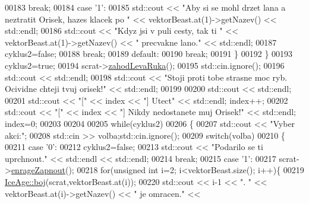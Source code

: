 \begin{DoxyCode}
00183                     \textcolor{keywordflow}{break};
00184                 \textcolor{keywordflow}{case} \textcolor{charliteral}{'1'}:
00185                     std::cout << \textcolor{stringliteral}{"Aby si se mohl drzet lana a neztratit Orisek, hazes klacek po "} << 
      vektorBeast.at(1)->getNazev() << std::endl;
00186                     std::cout << \textcolor{stringliteral}{"Kdyz jsi v puli cesty, tak ti "} << vektorBeast.at(1)->getNazev() << \textcolor{stringliteral}{"
       precvakne lano."} << std::endl;
00187                     cyklus2=\textcolor{keyword}{false};
00188                     \textcolor{keywordflow}{break};
00189                 \textcolor{keywordflow}{default}:
00190                     \textcolor{keywordflow}{break};
00191             \}
00192     \}
00193     cyklus2=\textcolor{keyword}{true};
00194     scrat->\hyperlink{classIceAge_1_1ObleceneVybaveniVeverky_ab02450c60394e0c21e08beff15971c60}{zahodLevaRuka}(); 
00195     std::cin.ignore();
00196     std::cout << std::endl;
00198     std::cout << \textcolor{stringliteral}{"Stoji proti tobe strasne moc ryb. Ocividne chteji tvuj orisek!"} << std::endl;
00199 
00200     std::cout << std::endl;
00201     std::cout << \textcolor{stringliteral}{"["} << index << \textcolor{stringliteral}{"] Utect"} << std::endl; index++;
00202     std::cout << \textcolor{stringliteral}{"["} << index << \textcolor{stringliteral}{"] Nikdy nedostanete muj Orisek!"} << std::endl; index=0;
00203 
00204 
00205     \textcolor{keywordflow}{while}(cyklus2)
00206     \{
00207         std::cout << \textcolor{stringliteral}{"Vyber akci:"};
00208         std::cin >> volba;std::cin.ignore();
00209             \textcolor{keywordflow}{switch}(volba)
00210             \{
00211                 \textcolor{keywordflow}{case} \textcolor{charliteral}{'0'}:
00212                     cyklus2=\textcolor{keyword}{false};
00213                     std::cout << \textcolor{stringliteral}{"Podarilo se ti uprchnout."} << std::endl << std::endl;
00214                     \textcolor{keywordflow}{break};
00215                 \textcolor{keywordflow}{case} \textcolor{charliteral}{'1'}:
00217                     scrat->\hyperlink{classIceAge_1_1Veverka_a3b917725872714ac866bc2028bf7d7d9}{enrageZapnout}();
00218                     \textcolor{keywordflow}{for}(\textcolor{keywordtype}{unsigned} \textcolor{keywordtype}{int} i=2; i<vektorBeast.size(); i++)\{
00219                         \hyperlink{namespaceIceAge_a2c6b97286bcd54e3ecf2fdc335460e90}{IceAge::boj}(scrat,vektorBeast.at(i));
00220                         std::cout << i-1 << \textcolor{stringliteral}{". "} << vektorBeast.at(i)->getNazev() << \textcolor{stringliteral}{" je omracen."} << 

\end{DoxyCode}
